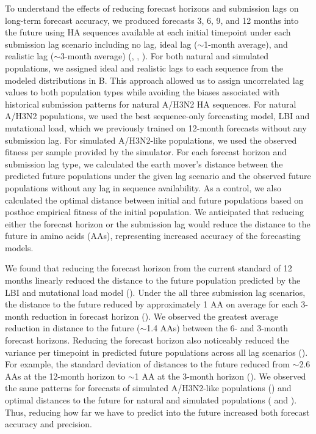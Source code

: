 \documentclass[9pt,lineno]{elife}
\begin{document}
To understand the effects of reducing forecast horizons and submission lags on long-term forecast accuracy, we produced forecasts 3, 6, 9, and 12 months into the future using HA sequences available at each initial timepoint under each submission lag scenario including no lag, ideal lag ($\sim$1-month average), and realistic lag ($\sim$3-month average) (, , ).
For both natural and simulated populations, we assigned ideal and realistic lags to each sequence from the modeled distributions in B.
This approach allowed us to assign uncorrelated lag values to both population types while avoiding the biases associated with historical submission patterns for natural A/H3N2 HA sequences.
For natural A/H3N2 populations, we used the best sequence-only forecasting model, LBI and mutational load, which we previously trained on 12-month forecasts without any submission lag.
For simulated A/H3N2-like populations, we used the observed fitness per sample provided by the simulator.
For each forecast horizon and submission lag type, we calculated the earth mover's distance between the predicted future populations under the given lag scenario and the observed future populations without any lag in sequence availability.
As a control, we also calculated the optimal distance between initial and future populations based on posthoc empirical fitness of the initial population.
We anticipated that reducing either the forecast horizon or the submission lag would reduce the distance to the future in amino acids (AAs), representing increased accuracy of the forecasting models.

We found that reducing the forecast horizon from the current standard of 12 months linearly reduced the distance to the future population predicted by the LBI and mutational load model ().
Under the all three submission lag scenarios, the distance to the future reduced by approximately 1 AA on average for each 3-month reduction in forecast horizon ().
We observed the greatest average reduction in distance to the future ($\sim$1.4 AAs) between the 6- and 3-month forecast horizons.
Reducing the forecast horizon also noticeably reduced the variance per timepoint in predicted future populations across all lag scenarios ().
For example, the standard deviation of distances to the future reduced from $\sim$2.6 AAs at the 12-month horizon to $\sim$1 AA at the 3-month horizon ().
We observed the same patterns for forecasts of simulated A/H3N2-like populations () and optimal distances to the future for natural and simulated populations ( and ).
Thus, reducing how far we have to predict into the future increased both forecast accuracy and precision.
\end{document}
